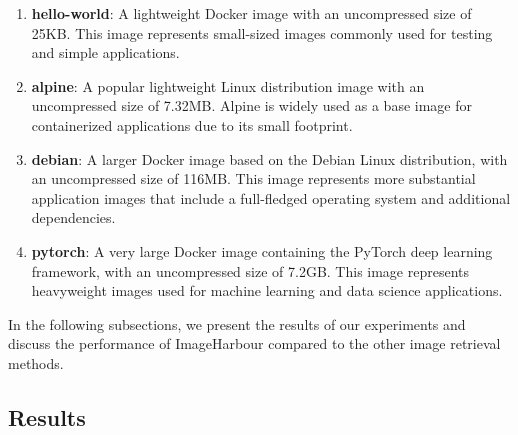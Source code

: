 \begin{enumerate}
    \itemsep0em
    \item \textbf{hello-world}: A lightweight Docker image with an uncompressed size of 25KB. This image represents small-sized images commonly used for testing and simple applications.
    \item \textbf{alpine}: A popular lightweight Linux distribution image with an uncompressed size of 7.32MB. Alpine is widely used as a base image for containerized applications due to its small footprint.
    \item \textbf{debian}: A larger Docker image based on the Debian Linux distribution, with an uncompressed size of 116MB. This image represents more substantial application images that include a full-fledged operating system and additional dependencies.
    \item \textbf{pytorch}: A very large Docker image containing the PyTorch deep learning framework, with an uncompressed size of 7.2GB. This image represents heavyweight images used for machine learning and data science applications.
\end{enumerate}

In the following subsections, we present the results of our experiments and discuss the performance of ImageHarbour compared to the other image retrieval methods.

\subsection{Results}

\begin{table}[h]
    \centering
    \caption{Image retrieval times (in milliseconds) for different images. The numbers in the bracket for Local Disk, Local Registry, and DockerHub represent the latency slowdown factor as compared to ImageHarbour.}
    \label{tab:image_retrieval_times}
\end{table}


